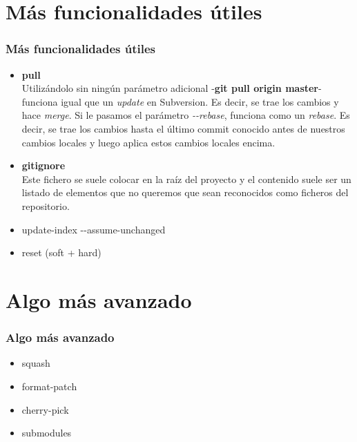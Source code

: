 \section{Más funcionalidades útiles}
\frame
{
\frametitle{Más funcionalidades útiles}
\begin{itemize}
 \item \textbf{pull}\\ \indent
Utilizándolo sin ningún parámetro adicional -\textbf{git pull origin master}- funciona igual que un \textit{update} en Subversion. Es decir, se trae los cambios y hace \textit{merge}. Si le pasamos el parámetro \textit{-{}-rebase}, funciona como un \textit{rebase}. Es decir, se trae los cambios hasta el último commit conocido antes de nuestros cambios locales y luego aplica estos cambios locales encima.
 \item \textbf{gitignore}\\ \indent
Este fichero se suele colocar en la raíz del proyecto y el contenido suele ser un listado de elementos que no queremos que sean reconocidos como ficheros del repositorio. 
 \item update-index -{}-assume-unchanged
 \item reset (soft + hard)
\end{itemize}
}

\section{Algo más avanzado}
\frame
{
\frametitle{Algo más avanzado}
\begin{itemize}
 \item squash
 \item format-patch
 \item cherry-pick
 \item submodules
\end{itemize}
}
